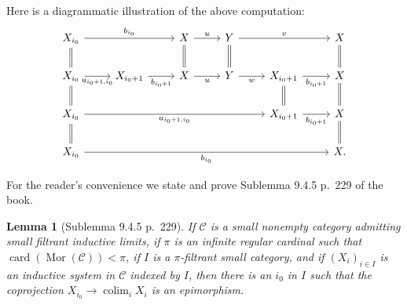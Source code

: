 \documentclass[12pt]{article}%
\newtheorem{lem}[thm]{Lemma}
\theoremstyle{remark}
\theoremstyle{definition}
\newcommand{\C}{\mathcal C}
\DeclareMathOperator*{\colim}{colim}%
\DeclareMathOperator{\card}{card}%
\DeclareMathOperator{\Mor}{Mor}
\begin{document}
Here is a diagrammatic illustration of the above computation:
$$
\begin{tikzcd}
X_{i_0}\ar[equal]{d}\ar{rr}{b_{i_0}}&&X\ar[equal]{d}\ar{r}{u}&Y\ar[equal]{d}\ar{rr}{v}&&X\ar[equal]{d}\\ 
X_{i_0}\ar[equal]{d}\ar{r}[swap]{u_{i_0+1,i_0}}&X_{i_0+1}\ar{r}[swap]{b_{i_0+1}}&X\ar{r}[swap]{u}&Y\ar{r}[swap]{w}&X_{i_0+1}\ar[equal]{d}\ar{r}[swap]{b_{i_0+1}}&X\ar[equal]{d}\\ 
X_{i_0}\ar[equal]{d}\ar{rrrr}[swap]{u_{i_0+1,i_0}}&&&&X_{i_0+1}\ar{r}[swap]{b_{i_0+1}}&X\ar[equal]{d}\\ 
X_{i_0}\ar{rrrrr}[swap]{b_{i_0}}&&&&&X.
\end{tikzcd}
$$ 

For the reader's convenience we state and prove Sublemma 9.4.5 p.~229 of the book.

\begin{lem}[Sublemma 9.4.5 p.~229]\label{945}
If $\C$ is a small nonempty category admitting small filtrant inductive limits, if $\pi$ is an infinite regular cardinal such that $\card(\Mor(\C))<\pi$, if $I$ is a $\pi$-filtrant small category, and if $(X_i)_{i\in I}$ is an inductive system in $\C$ indexed by $I$, then there is an $i_0$ in $I$ such that the coprojection $X_{i_0}\to\colim_iX_i$ is an epimorphism. 
\end{lem}
\end{document}
